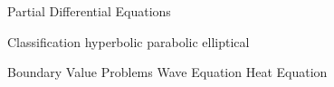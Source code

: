 Partial Differential Equations

Classification 
hyperbolic
parabolic
elliptical

Boundary Value Problems
Wave Equation
Heat Equation
